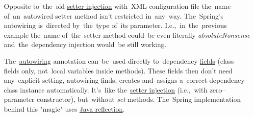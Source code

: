 \notenonl Opposite to~the~old \hyperref[setterinjection]{setter injection} with~XML configuration file the~name of~an~autowired setter method isn't restricted in~any~way. The~Spring's autowiring is~directed by~the~type of~its parameter. I.e.,~in~the~previous example the~name of~the~setter method could~be even literally \textit{absoluteNonsense} and~the~dependency injection would~be still working.
\newpage

\label{fieldinjection}
The~\hyperref[autowiring]{autowiring} annotation can~be~used directly to~dependency \hyperref[variablefieldproperty]{fields} (class fields only, not~local variables inside methods). These fields then don't need any~explicit setting, autowiring finds, creates and~assigns a~correct dependency class instance automatically. It's~like the~\hyperref[setterinjection]{setter injection} (i.e.,~with zero--parameter constructor), but~without \textit{set} methods. The~Spring implementation behind this "magic" uses \hyperref[reflection]{Java reflection}.

